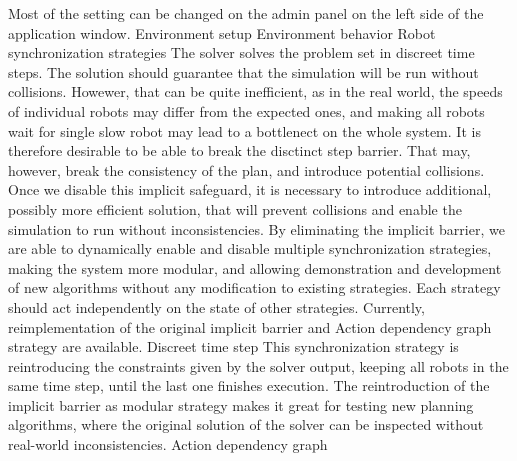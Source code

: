 \fleetControlAdminPanel
Most of the setting can be changed on the admin panel on the left side of the application window.
\sec Environment setup
\sec Environment behavior
\br\br
\sec Robot synchronization strategies
The solver solves the problem set in discreet time steps. The solution should guarantee that the simulation will be run without collisions. Howewer, that can be quite inefficient, as in the real world, the speeds of individual robots may differ from the expected ones, and making all robots wait for single slow robot may lead to a bottlenect on the whole system. It is therefore desirable to be able to break the disctinct step barrier. That may, however, break the consistency of the plan, and introduce potential collisions. Once we disable this implicit safeguard, it is necessary to introduce additional, possibly more efficient solution, that will prevent collisions and enable the simulation to run without inconsistencies.\br
By eliminating the implicit barrier, we are able to dynamically enable and disable multiple synchronization strategies, making the system more modular, and allowing demonstration and development of new algorithms without any modification to existing strategies. Each strategy should act independently on the state of other strategies. \br
Currently, reimplementation of the original implicit barrier and Action dependency graph strategy are available.
\secc Discreet time step
This synchronization strategy is reintroducing the constraints given by the solver output, keeping all robots in the same time step, until the last one finishes execution. The reintroduction of the implicit barrier as modular strategy makes it great for testing new planning algorithms, where the original solution of the solver can be inspected without real-world inconsistencies.
\vfil \break
\secc Action dependency graph
